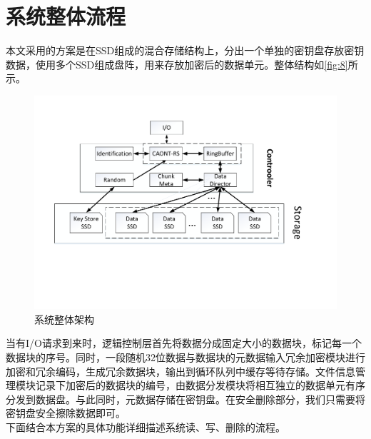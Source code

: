 \section{系统整体流程}
本文采用的方案是在SSD组成的混合存储结构上，分出一个单独的密钥盘存放密钥数据，使用多个SSD组成盘阵，用来存放加密后的数据单元。整体结构如\autoref{fig:8}所示。
\begin{figure}[H]
	\centering
	\includegraphics[width=1\textwidth]{Pics/total-store-structure.pdf}
	\caption{系统整体架构}\label{fig:8}
\end{figure}
当有I/O请求到来时，逻辑控制层首先将数据分成固定大小的数据块，标记每一个数据块的序号。同时，一段随机32位数据与数据块的元数据输入冗余加密模块进行加密和冗余编码，生成冗余数据块，输出到循环队列中缓存等待存储。文件信息管理模块记录下加密后的数据块的编号，由数据分发模块将相互独立的数据单元有序分发到数据盘。与此同时，元数据存储在密钥盘。在安全删除部分，我们只需要将密钥盘安全擦除数据即可。\\
下面结合本方案的具体功能详细描述系统读、写、删除的流程。
